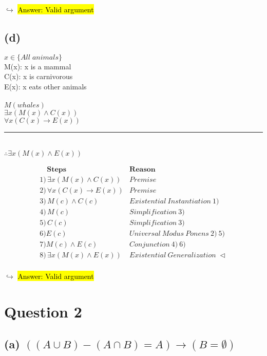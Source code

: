 \documentclass[a4paper, 12pt]{article}
\begin{document}
$\hookrightarrow$ \hl{Answer: Valid argument}

\subsection*{(d)}

$x \in \{ All \; animals\}$\\
M(x): x is a mammal\\
C(x): x is carnivorous\\
E(x): x eats other animals\\\\

$M(whales)$\\
$\exists x (M(x) \land C(x))$\\
$\forall x (C(x) \rightarrow E(x))$\\
\rule{3.5cm}{0.01cm}\\
$\therefore \exists x (M(x) \land E(x))$

\[\begin{array}{lll}%
\quad \textbf{Steps}  &  \textbf{Reason}\\
1)\, \exists x (M(x) \land C(x)) & Premise \\ 
2)\,  \forall x(C(x) \rightarrow E(x)) & Premise \\
3)\,  M(c) \land C(c) & Existential \: Instantiation \: 1) \\
4)\, M(c) & Simplification \: 3)\\
5)\, C(c) & Simplification \: 3)\\
6) E(c) & Universal \: Modus \: Ponens \: 2) \: 5)\\
7) M(c) \land E(c) & Conjunction \: 4) \: 6)\\
8)\, \exists x (M(x) \land E(x))  & Existential \: Generalization \; \lhd\\
\end{array}\]

$\hookrightarrow$ \hl{Answer: Valid argument}

\section*{Question 2}

\subsection*{(a) $ ((A \cup B) - (A \cap B) = A) \rightarrow (B = \emptyset) $}
\end{document}
